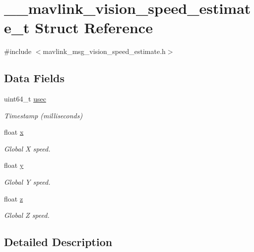 \hypertarget{struct____mavlink__vision__speed__estimate__t}{\section{\-\_\-\-\_\-mavlink\-\_\-vision\-\_\-speed\-\_\-estimate\-\_\-t Struct Reference}
\label{struct____mavlink__vision__speed__estimate__t}
}


{\ttfamily \#include $<$mavlink\-\_\-msg\-\_\-vision\-\_\-speed\-\_\-estimate.\-h$>$}

\subsection*{Data Fields}
\begin{DoxyCompactItemize}
\item 
uint64\-\_\-t \hyperlink{struct____mavlink__vision__speed__estimate__t_adfc952857e519d31dfaa6f3cdd153843}{usec}
\begin{DoxyCompactList}\small\item\em Timestamp (milliseconds) \end{DoxyCompactList}\item 
float \hyperlink{struct____mavlink__vision__speed__estimate__t_a8fcd91c8bacb70d5b1bd6df87fb01a5a}{x}
\begin{DoxyCompactList}\small\item\em Global X speed. \end{DoxyCompactList}\item 
float \hyperlink{struct____mavlink__vision__speed__estimate__t_ae2bcf3949b4e0ac7d21b4bc886fea08c}{y}
\begin{DoxyCompactList}\small\item\em Global Y speed. \end{DoxyCompactList}\item 
float \hyperlink{struct____mavlink__vision__speed__estimate__t_a019d0fa1a28f8c96b0092c9c47ced03d}{z}
\begin{DoxyCompactList}\small\item\em Global Z speed. \end{DoxyCompactList}\end{DoxyCompactItemize}


\subsection{Detailed Description}


